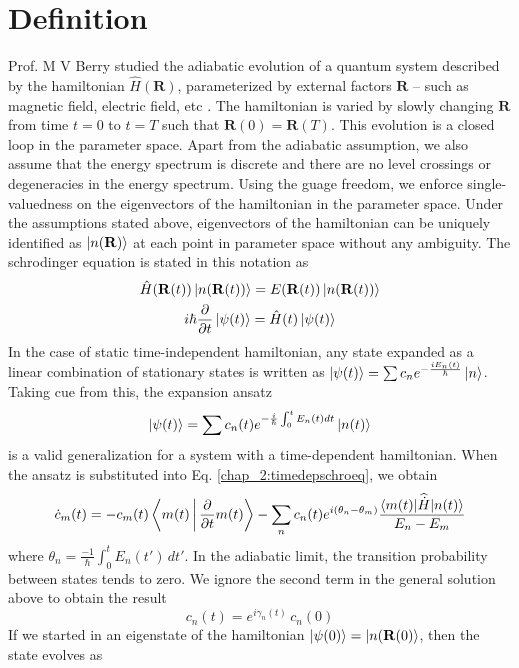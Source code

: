 \section{Definition}
Prof. M V Berry studied the adiabatic evolution of a quantum system described by the hamiltonian $\hat{H}(\mathbf{R})$, parameterized by external factors $\mathbf{R}$ -- such as
magnetic field, electric field, etc \cite{berry1984quantal}. The hamiltonian is varied by slowly changing $\mathbf{R}$ from time $t=0$ to $t=T$ such that $\mathbf{R}(0)=\mathbf{R}(T)$. This evolution is
a closed loop in the parameter space. Apart from the adiabatic assumption, we also assume that the energy spectrum is discrete and there are no level crossings or degeneracies in the 
energy spectrum. Using the guage freedom, we enforce single-valuedness on the eigenvectors of the hamiltonian in the parameter space. 
Under the assumptions stated above, eigenvectors of the hamiltonian can be uniquely identified as $\ket{n(\mathbf{R})}$ at each point in parameter space without any ambiguity.
The schrodinger equation is stated in this notation as 
\begin{gather}
 \hat{H}(\mathbf{R}(t))\ket{n(\mathbf{R}(t))} = E(\mathbf{R}(t))\ket{n(\mathbf{R}(t))} \\
 \label{chap_2:timedepschroeq} i\hbar\frac{\partial}{\partial t}\ket{\psi(t)} = \hat{H}(t)\ket{\psi(t)}
\end{gather} In the case of static time-independent hamiltonian, any state expanded as a linear combination of stationary states is written as
$\ket{\psi(t)} = \sum{c_n e^{-\frac{i E_{n}(t)}{\hbar}} \ket{n}}$. Taking cue from this, the expansion ansatz
\begin{equation}
\ket{\psi(t)} = \sum{c_{n}(t) e^{-\frac{i}{\hbar}\int_{0}^{t}{E_{n}(t) dt}} \ket{n(t)}}
\end{equation} is a valid generalization for a system with a time-dependent hamiltonian. When the ansatz is substituted into Eq. \eqref{chap_2:timedepschroeq}, we obtain
\begin{equation}
  \label{chap_2:coeffslinercomb}\dot{c}_{m}(t) = -c_{m}(t) \Braket{m(t) | \frac{\partial}{\partial t} m(t)} - \sum_{n}{c_{n}(t) e^{i (\theta_n - \theta_m)} \frac{\braket{m(t)|\widehat{\dot{H}}|n(t)}}{E_n - E_m}}
\end{equation} where $\theta_n = \frac{-1}{\hbar}\int_{0}^{t}{E_n(t')\,dt'}$. In the adiabatic limit, the transition probability between states tends to zero.
We ignore the second term in the general solution above to obtain the result
\begin{equation}
 c_{n}(t) = e^{i \gamma_{n}(t)}\,c_{n}(0)
\end{equation} If we started in an eigenstate of the hamiltonian $\ket{\psi(0)} = \ket{n(\mathbf{R}(0)}$, then the state evolves as
